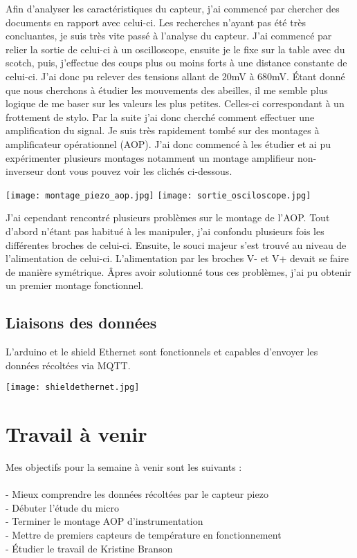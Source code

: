 \documentclass[12pt]{article}
\begin{document}
Afin d'analyser les caractéristiques du capteur, j'ai commencé par chercher des documents en rapport avec celui-ci. Les recherches n'ayant pas 
été très concluantes, je suis très vite passé à l'analyse du capteur. J'ai commencé par relier la sortie de celui-ci à un oscilloscope, ensuite je le fixe
sur la table avec du scotch, puis, j'effectue des coups plus ou moins forts à une distance constante de celui-ci. J'ai donc pu relever des tensions allant de 20mV à 680mV.
Étant donné que nous cherchons à étudier les mouvements des abeilles, il me semble plus logique de me baser sur les valeurs les plus petites. Celles-ci correspondant à un frottement de stylo.
Par la suite j'ai donc cherché comment effectuer une amplification du signal. Je suis très rapidement tombé sur des montages à amplificateur opérationnel (AOP). J'ai donc commencé
à les étudier et ai pu expérimenter plusieurs montages notamment un montage amplifieur non-inverseur dont vous pouvez voir les clichés ci-dessous.

\begin{center}	
	\texttt{[image: montage\_piezo\_aop.jpg]}
	\label{image3}
	\texttt{[image: sortie\_osciloscope.jpg]}
	\label{image4}
\end{center}
\newpage
J'ai cependant rencontré plusieurs problèmes sur le montage de l'AOP. Tout d'abord n'étant pas habitué 
à les manipuler, j'ai confondu plusieurs fois les différentes broches de celui-ci. Ensuite, le souci majeur 
s'est trouvé au niveau de l'alimentation de celui-ci. L'alimentation par les broches V- et V+ devait se faire 
de manière symétrique. 
Âpres avoir solutionné tous ces problèmes, j'ai pu obtenir un premier montage fonctionnel.

\subsection{Liaisons des données}
L'arduino et le shield Ethernet sont fonctionnels et capables d'envoyer les données récoltées via MQTT.
\begin{center}	
	\texttt{[image: shieldethernet.jpg]}
	\label{image5}
\end{center}
\section{Travail à venir}
Mes objectifs pour la semaine à venir sont les suivants :\\
\\
	- Mieux comprendre les données récoltées par le capteur piezo\\
	- Débuter l'étude du micro\\
	- Terminer le montage AOP d'instrumentation\\
	- Mettre de premiers capteurs de température en fonctionnement\\
	- Étudier le travail de Kristine Branson\\

\newpage
\listoffigures
\end{document}
